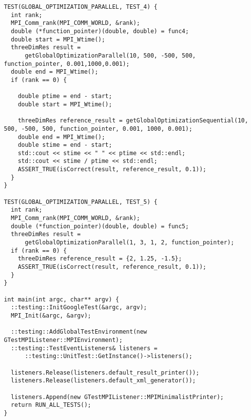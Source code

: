 \documentclass{report}
\begin{document}
\begin{lstlisting}
TEST(GLOBAL_OPTIMIZATION_PARALLEL, TEST_4) {
  int rank;
  MPI_Comm_rank(MPI_COMM_WORLD, &rank);
  double (*function_pointer)(double, double) = func4;
  double start = MPI_Wtime();
  threeDimRes result =
      getGlobalOptimizationParallel(10, 500, -500, 500, function_pointer, 0.001,1000,0.001);
  double end = MPI_Wtime();
  if (rank == 0) {

    double ptime = end - start;
    double start = MPI_Wtime();

    threeDimRes reference_result = getGlobalOptimizationSequential(10, 500, -500, 500, function_pointer, 0.001, 1000, 0.001);
    double end = MPI_Wtime();
    double stime = end - start;
    std::cout << stime << " " << ptime << std::endl;
    std::cout << stime / ptime << std::endl;
    ASSERT_TRUE(isCorrect(result, reference_result, 0.1));
  }
}

TEST(GLOBAL_OPTIMIZATION_PARALLEL, TEST_5) {
  int rank;
  MPI_Comm_rank(MPI_COMM_WORLD, &rank);
  double (*function_pointer)(double, double) = func5;
  threeDimRes result =
      getGlobalOptimizationParallel(1, 3, 1, 2, function_pointer);
  if (rank == 0) {
    threeDimRes reference_result = {2, 1.25, -1.5};
    ASSERT_TRUE(isCorrect(result, reference_result, 0.1));
  }
}

int main(int argc, char** argv) {
  ::testing::InitGoogleTest(&argc, argv);
  MPI_Init(&argc, &argv);

  ::testing::AddGlobalTestEnvironment(new GTestMPIListener::MPIEnvironment);
  ::testing::TestEventListeners& listeners =
      ::testing::UnitTest::GetInstance()->listeners();

  listeners.Release(listeners.default_result_printer());
  listeners.Release(listeners.default_xml_generator());

  listeners.Append(new GTestMPIListener::MPIMinimalistPrinter);
  return RUN_ALL_TESTS();
}
\end{lstlisting}
\end{document}

